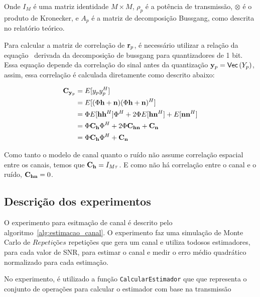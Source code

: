 \documentclass{article}
\begin{document}
Onde $I_M$ é uma matriz identidade $M\times M$, $\rho_p$ é a potência de transmissão, $\otimes$ é o produto de Kronecker, e $A_p$ é a matriz de decomposição Bussgang, como descrita no relatório teórico.

Para calcular a matriz de correlação de $\mathbf{r}_p$, é necessário utilizar a relação da equação~\cite[eq. (13)]{li.etal_2017a} derivada da decomposição de bussgang para quantizadores de 1 bit. Essa equação depende da correlação do sinal antes da quantização $\mathbf{y}_p= \mathsf{Vec} \left( Y_p \right) $, assim, essa correlação é calculada diretamente como descrito abaixo:

\begin{align}
    \label{eq:calculo_correlacao_yp}
    \mathbf{C}_{\mathbf{y}_p}   &= E[y_py_p^H] \\ \nonumber
                    &= E[(\Phi \mathbf{h} + \mathbf{n})(\Phi \mathbf{h} + \mathbf{n})^H] \\ \nonumber 
                    &= \Phi E[\mathbf{h} \mathbf{h}^H] \Phi^H + 2\Phi E[\mathbf{h}\mathbf{n}^H] + E[\mathbf{n}\mathbf{n}^H] \\ \nonumber 
                    &= \Phi \mathbf{C}_{\mathbf{h}} \Phi^H + 2\Phi\mathbf{C}_{\mathbf{h}\mathbf{n}} + \mathbf{C}_{\mathbf{n}} \\ \nonumber 
                    &= \Phi \mathbf{C}_{\mathbf{h}} \Phi^H + \mathbf{C}_{\mathbf{n}}
\end{align}

Como tanto o modelo de canal quanto o ruído não assume correlação espacial entre os canais, temos que $\mathbf{C}_{\mathbf{h}}=I_{M\tau}$. E como não há correlação entre o canal e o ruído, $\mathbf{C}_{\mathbf{h}\mathbf{n}}=0$.

\subsection{Descrição dos experimentos}

O experimento para esitmação de canal é descrito pelo algoritmo~\ref{alg:estimacao_canal}. O experimento faz uma simulação de Monte Carlo de $Repetições$ repetições que gera um canal e utiliza todosos estimadores, para cada valor de SNR, para estimar o canal e medir o erro médio quadrático normalizado para cada estimação.  

No experimento, é utilizado a função \texttt{CalcularEstimador} que que representa o conjunto de operações para calcular o estimador com base na transmissão  
\end{document}
